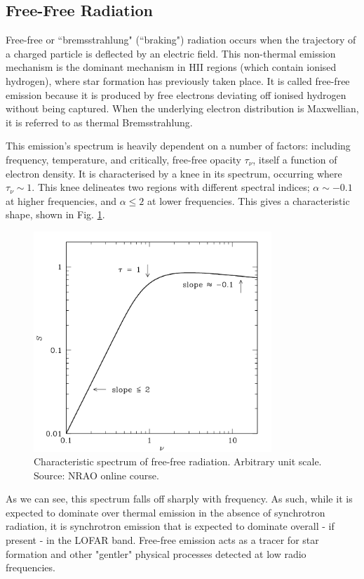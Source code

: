 \subsection{Free-Free Radiation}
\pg
Free-free or ``bremsstrahlung" (``braking") radiation occurs when the trajectory of a charged particle is deflected by an electric field. This non-thermal emission mechanism is the dominant mechanism in HII regions (which contain ionised hydrogen), where star formation has previously taken place. It is called free-free emission because it is produced by free electrons deviating off ionised hydrogen without being captured. When the underlying electron distribution is Maxwellian, it is referred to as thermal Bremsstrahlung.%

\pg
This emission's spectrum is heavily dependent on a number of factors: including frequency, temperature, and critically, free-free opacity $\tau_\nu$, itself a function of electron density. It is characterised by a knee in its spectrum, occurring where $\tau_\nu\sim 1$. This knee delineates two regions with different spectral indices; $\alpha \sim -0.1$ at higher frequencies, and $\alpha \leq 2$ at lower frequencies. This gives a characteristic shape, shown in Fig. \ref{plot.freefree.spectrum}.
\begin{figure}[!h]
\centering
\includegraphics[width=0.8\textwidth]{images/freefree.png}
\caption{\label{plot.freefree.spectrum} Characteristic spectrum of free-free radiation. Arbitrary unit scale. Source: NRAO online course.}
\end{figure}

\pg
As we can see, this spectrum falls off sharply with frequency. As such, while it is expected to dominate over thermal emission in the absence of synchrotron radiation, it is synchrotron emission that is expected to dominate overall - if present - in the LOFAR band. Free-free emission acts as a tracer for star formation and other "gentler" physical processes detected at low radio frequencies.

